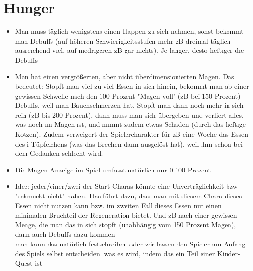 \section{Hunger}
\begin{itemize}
	\item Man muss täglich wenigstens einen Happen zu sich nehmen, sonst bekommt man Debuffs (auf höheren Schwierigkeitsstufen mehr zB dreimal täglich ausreichend viel, auf niedrigeren zB gar nichts). Je länger, desto heftiger die Debuffs
	\item Man hat einen vergrößerten, aber nicht überdimensionierten Magen. Das bedeutet: Stopft man viel zu viel Essen in sich hinein, bekommt man ab einer gewissen Schwelle nach den 100 Prozent "Magen voll" (zB bei 150 Prozent) Debuffs, weil man Bauchschmerzen hat. Stopft man dann noch mehr in sich rein (zB bis 200 Prozent), dann muss man sich übergeben und verliert alles, was noch im Magen ist, und nimmt zudem etwas Schaden (durch das heftige Kotzen). Zudem verweigert der Spielercharakter für zB eine Woche das Essen des i-Tüpfelchens (was das Brechen dann ausgelöst hat), weil ihm schon bei dem Gedanken schlecht wird. 
	\item Die Magen-Anzeige im Spiel umfasst natürlich nur 0-100 Prozent
	\item Idee: jeder/einer/zwei der Start-Charas könnte eine Unverträglichkeit bzw "schmeckt nicht" haben. Das führt dazu, dass man mit diesem Chara dieses Essen nicht nutzen kann bzw. im zweiten Fall dieses Essen nur einen minimalen Bruchteil der Regeneration bietet. Und zB nach einer gewissen Menge, die man das in sich stopft (unabhängig vom 150 Prozent Magen), dann auch Debuffs dazu kommen\\
	man kann das natürlich festschreiben oder wir lassen den Spieler am Anfang des Spiels selbst entscheiden, was es wird, indem das ein Teil einer Kinder-Quest ist
\end{itemize}